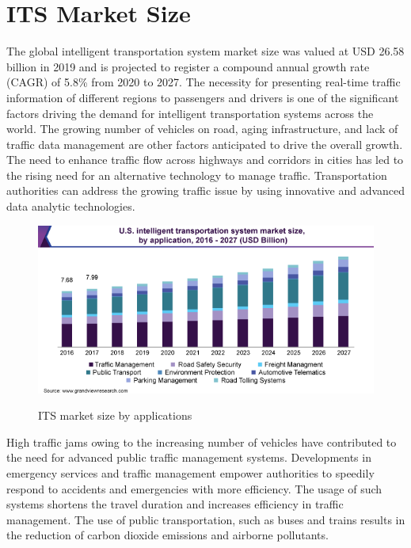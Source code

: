 \section{ITS Market Size}
\hspace{2cm}The global intelligent transportation system market size was valued at USD 26.58 billion in 2019 and is projected to register a compound annual growth rate (CAGR) of 5.8\% from 2020 to 2027. The necessity for presenting real-time traffic information of different regions to passengers and drivers is one of the significant factors driving the demand for intelligent transportation systems across the world. The growing number of vehicles on road, aging infrastructure, and lack of traffic data management are other factors anticipated to drive the overall growth. The need to enhance traffic flow across highways and corridors in cities has led to the rising need for an alternative technology to manage traffic. Transportation authorities can address the growing traffic issue by using innovative and advanced data analytic technologies.
\begin{figure}[htp]%
    \center%
    \includegraphics[width=1\textwidth]{images/ch1/us-intelligent-trITS-market.png}%
    \caption[ITS market size by applications]{ITS market size by applications}\cite{web003}\label{fig: ITS market size by applications}%
  \end{figure}
  
  High traffic jams owing to the increasing number of vehicles have contributed to the need for advanced public traffic management systems. Developments in emergency services and traffic management empower authorities to speedily respond to accidents and emergencies with more efficiency. The usage of such systems shortens the travel duration and increases efficiency in traffic management. The use of public transportation, such as buses and trains results in the reduction of carbon dioxide emissions and airborne pollutants.

